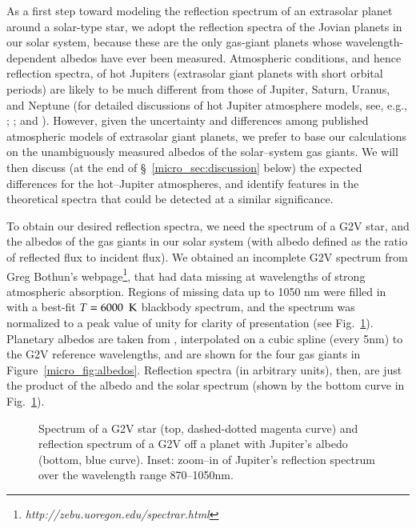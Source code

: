 As a first step toward modeling the reflection spectrum of an
extrasolar planet around a solar-type star, we adopt the reflection
spectra of the Jovian planets in our solar system, because these are
the only gas-giant planets whose wavelength-dependent albedos have
ever been measured.  Atmospheric conditions, and hence reflection
spectra, of hot Jupiters (extrasolar giant planets with short orbital
periods) are likely to be much different from those of Jupiter,
Saturn, Uranus, and Neptune (for detailed discussions of hot Jupiter
atmosphere models, see, e.g., \citet[hereafter
SBH03]{sudarsky_et_al2003}; \citet{burrows_et_al2004}; and
\citet{seager_et_al2000}).  However, given the uncertainty and
differences among published atmospheric models of extrasolar giant
planets, we prefer to base our calculations on the unambiguously
measured albedos of the solar--system gas giants.  We will then
discuss (at the end of \S~\ref{micro_sec:discussion} below) the expected
differences for the hot--Jupiter atmospheres, and identify features in
the theoretical spectra that could be detected at a similar
significance.

To obtain our desired reflection spectra, we need the spectrum of a
G2V star, and the albedos of the gas giants in our solar system (with
albedo defined as the ratio of reflected flux to incident flux).  We
obtained an incomplete G2V spectrum from Greg Bothun's
webpage\footnote{\textsl{http://zebu.uoregon.edu/spectrar.html}}, that
had data missing at wavelengths of strong atmospheric absorption.
Regions of missing data up to 1050 nm were filled in with a best-fit
$T=6000~{\rm~K}$ blackbody spectrum, and the spectrum was normalized
to a peak value of unity for clarity of presentation (see
Fig.~\ref{micro_fig:reflect}).  Planetary albedos are taken from
\citet{karkoschka1994}, interpolated on a cubic spline (every 5nm) to
the G2V reference wavelengths, and are shown for the four gas giants
in Figure~\ref{micro_fig:albedos}.  Reflection spectra (in arbitrary units),
then, are just the product of the albedo and the solar spectrum (shown
by the bottom curve in Fig.~\ref{micro_fig:reflect}).

\begin{figure}[p]
\caption[G2V spectrum and reflection spectrum off Jupiter.]{Spectrum
of a G2V star (top, dashed-dotted magenta curve) and reflection
spectrum of a G2V off a planet with Jupiter's albedo (bottom, blue
curve).  Inset: zoom--in of Jupiter's reflection spectrum over the
wavelength range 870--1050nm.}
\label{micro_fig:reflect} 
\end{figure}
\afterpage{\clearpage}

